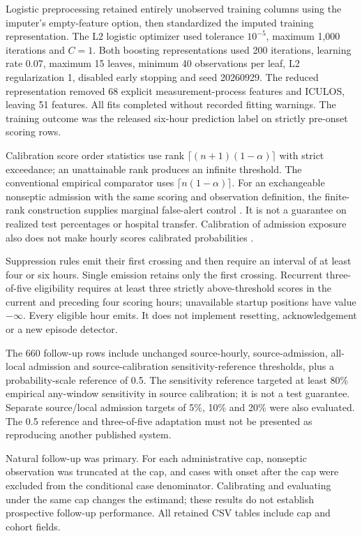 \documentclass[11pt,a4paper]{article}
\begin{document}
Logistic preprocessing retained entirely unobserved training columns using the imputer's empty-feature option, then standardized the imputed training representation. The L2 logistic optimizer used tolerance $10^{-5}$, maximum 1,000 iterations and $C=1$. Both boosting representations used 200 iterations, learning rate 0.07, maximum 15 leaves, minimum 40 observations per leaf, L2 regularization 1, disabled early stopping and seed 20260929. The reduced representation removed 68 explicit measurement-process features and ICULOS, leaving 51 features. All fits completed without recorded fitting warnings. The training outcome was the released six-hour prediction label on strictly pre-onset scoring rows.

Calibration score order statistics use rank $\lceil(n+1)(1-\alpha)\rceil$ with strict exceedance; an unattainable rank produces an infinite threshold. The conventional empirical comparator uses $\lceil n(1-\alpha)\rceil$. For an exchangeable nonseptic admission with the same scoring and observation definition, the finite-rank construction supplies marginal false-alert control \cite{angelopoulos}. It is not a guarantee on realized test percentages or hospital transfer. Calibration of admission exposure also does not make hourly scores calibrated probabilities \cite{vancalster}.

Suppression rules emit their first crossing and then require an interval of at least four or six hours. Single emission retains only the first crossing. Recurrent three-of-five eligibility requires at least three strictly above-threshold scores in the current and preceding four scoring hours; unavailable startup positions have value $-\infty$. Every eligible hour emits. It does not implement resetting, acknowledgement or a new episode detector.

The 660 follow-up rows include unchanged source-hourly, source-admission, all-local admission and source-calibration sensitivity-reference thresholds, plus a probability-scale reference of 0.5. The sensitivity reference targeted at least 80\% empirical any-window sensitivity in source calibration; it is not a test guarantee. Separate source/local admission targets of 5\%, 10\% and 20\% were also evaluated. The 0.5 reference and three-of-five adaptation must not be presented as reproducing another published system.

Natural follow-up was primary. For each administrative cap, nonseptic observation was truncated at the cap, and cases with onset after the cap were excluded from the conditional case denominator. Calibrating and evaluating under the same cap changes the estimand; these results do not establish prospective follow-up performance. All retained CSV tables include cap and cohort fields.
\end{document}
